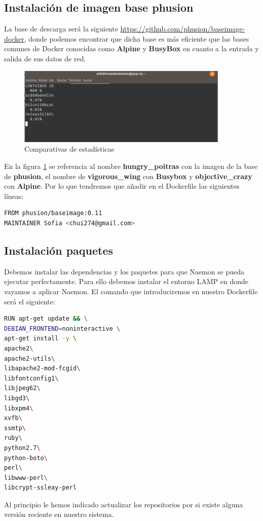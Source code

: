 \subsection{Instalación de imagen base phusion}
La base de descarga será la siguiente \url{https://github.com/phusion/baseimage-docker}, donde podemos encontrar que dicha base es más eficiente que las bases comunes de Docker conocidas como \textbf{Alpine} y \textbf{BusyBox} en cuanto a la entrada y salida de sus datos de red. 
\begin{figure}[H]
	\centering
	\includegraphics[width=0.9\textwidth]{imagenes/despliegue_naemon/estadisticasRAM.png}
	\caption{Comparativas de estadísticas} \label{phusion}
\end{figure}
En la figura \ref{phusion} se referencia al nombre \textbf{hungry\_poitras} con la imagen de la base de \textbf{phusion}, el nombre de \textbf{vigorous\_wing} con \textbf{Busybox} y \textbf{objective\_crazy} con \textbf{Alpine}.
\newpage
Por lo que tendremos que añadir en el Dockerfile las siguientes líneas:
\begin{lstlisting}[language=bash]
FROM phusion/baseimage:0.11
MAINTAINER Sofia <chui274@gmail.com>
\end{lstlisting}
\subsection{Instalación paquetes}
Debemos instalar las dependencias y los paquetes para que Naemon se pueda ejecutar perfectamente. Para ello debemos instalar el entorno LAMP en donde vayamos a aplicar Naemon. El comando que introduciremos en nuestro Dockerfile será el siguiente:
\begin{lstlisting}[language=bash]
RUN apt-get update && \
DEBIAN_FRONTEND=noninteractive \
apt-get install -y \
apache2\
apache2-utils\
libapache2-mod-fcgid\
libfontconfig1\
libjpeg62\
libgd3\
libxpm4\
xvfb\
ssmtp\
ruby\
python2.7\
python-boto\
perl\
libwww-perl\
libcrypt-ssleay-perl
\end{lstlisting}

Al principio le hemos indicado actualizar los repositorios por si existe alguna versión reciente en nuestro sistema.

